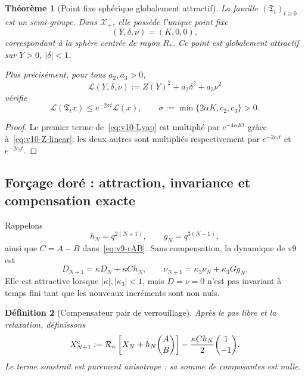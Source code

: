 \documentclass[11pt,a4paper]{article}
\newtheorem{theorem}{Théorème}[section]
\newtheorem{definition}[theorem]{Définition}
\begin{document}
\begin{theorem}[Point fixe sphérique globalement attractif]\label{thm:v10-global-fixed-sphere}
La famille $(\mathfrak T_t)_{t\ge0}$ est un semi-groupe. Dans $\mathcal X_+$, elle possède l'unique point fixe
\begin{equation}\label{eq:v10-unique-fixed}
 \boxed{(Y,\delta,\nu)=(K,0,0),}
\end{equation}
correspondant à la sphère centrée de rayon $R_*$. Ce point est globalement attractif sur $Y>0$, $|\delta|<1$.

Plus précisément, pour tous $a_2,a_3>0$,
\begin{equation}\label{eq:v10-Lyap}
 \mathcal L(Y,\delta,\nu)
 :=Z(Y)^2+a_2\delta^2+a_3\nu^2
\end{equation}
vérifie
\begin{equation}\label{eq:v10-Lyap-contract}
 \boxed{
 \mathcal L(\mathfrak T_t x)
 \le e^{-2\sigma t}\mathcal L(x),
 \qquad
 \sigma:=\min\{2\alpha K,c_2,c_3\}>0.}
\end{equation}
\end{theorem}

\begin{proof}
Le premier terme de~\eqref{eq:v10-Lyap} est multiplié par $e^{-4\alpha Kt}$ grâce à~\eqref{eq:v10-Z-linear}; les deux autres sont multipliés respectivement par $e^{-2c_2t}$ et $e^{-2c_3t}$.
\end{proof}

\subsection{Forçage doré : attraction, invariance et compensation exacte}

Rappelons
\[
 h_N=q^{2(N+1)},\qquad g_N=q^{3(N+1)},
\]
ainsi que $C=A-B$ dans~\eqref{eq:v9-rAB}. Sans compensation, la dynamique de v9 est
\[
 D_{N+1}=\kappa D_N+\kappa C h_N,
 \qquad
 \nu_{N+1}=\kappa_3\nu_N+\kappa_3Gg_N.
\]
Elle est attractive lorsque $|\kappa|,|\kappa_3|<1$, mais $D=\nu=0$ n'est pas invariant à temps fini tant que les nouveaux incréments sont non nuls.

\begin{definition}[Compensateur pair de verrouillage]\label{def:v10-even-compensator}
Après le pas libre et la relaxation, définissons
\begin{equation}\label{eq:v10-even-compensated-X}
 X_{N+1}^{\rm c}
 :=\mathcal R_\kappa
 \left[X_N+h_N\binom{A}{B}\right]
 -\frac{\kappa C h_N}{2}\binom{1}{-1}.
\end{equation}
Le terme soustrait est purement anisotrope : sa somme de composantes est nulle.
\end{definition}
\end{document}
